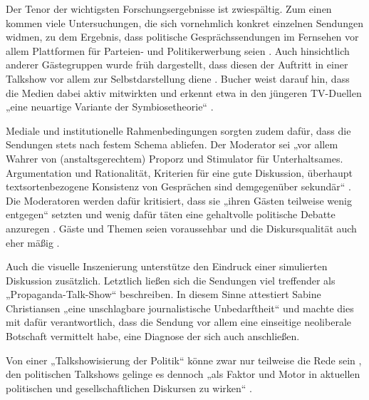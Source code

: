 Der Tenor der wichtigsten Forschungsergebnisse ist zwiespältig. Zum einen kommen viele Untersuchungen, die sich vornehmlich konkret einzelnen Sendungen widmen, zu dem Ergebnis, dass politische Gesprächssendungen im Fernsehen vor allem Plattformen für Parteien- und Politikerwerbung seien \parencites[199\psq]{hollyPolitischeFernsehdiskussionenZur1986}{schrottElefantenUnterSich1996}. Auch hinsichtlich anderer Gästegruppen wurde früh dargestellt, dass diesen der Auftritt in einer Talkshow vor allem zur Selbstdarstellung diene \parencite[162]{bayerTalkShowInszenierte1975}. Bucher weist darauf hin, dass die Medien dabei aktiv mitwirkten und erkennt etwa in den jüngeren TV-Duellen „eine neuartige Variante der Symbiosetheorie“ \parencite[302]{bucherMedienrealitaetPolitischenZur2004}.

Mediale und institutionelle Rahmenbedingungen sorgten zudem dafür, dass die Sendungen stets nach festem Schema abliefen. Der Moderator sei „vor allem Wahrer von (anstaltsgerechtem) Proporz und Stimulator für Unterhaltsames. Argumentation und Rationalität, Kriterien für eine gute Diskussion, überhaupt textsortenbezogene Konsistenz von Gesprächen sind demgegenüber sekundär“ \parencites[202]{hollyPolitischeFernsehdiskussionenZur1986}[vgl. auch][32\psq]{barloewenGrosseVorbildFernsehproduktion1975}[390\psqq]{nielandTalkshowisierungWahlkampfesAnalyse2002}. Die Moderatoren werden dafür kritisiert, dass sie „ihren Gästen teilweise wenig entgegen“ \parencite[314]{schultzModerationPolitischerGesprachsrunden2004} setzten und wenig dafür täten eine gehaltvolle politische Debatte anzuregen \parencite[151, passim]{tenscherShowdownImFernsehen1998}. Gäste und Themen seien voraussehbar \parencite[390\psqq]{nielandTalkshowisierungWahlkampfesAnalyse2002} und die Diskursqualität auch eher mäßig \parencite[226]{schichaInszenierungPolitischerDiskurse2002}.

Auch die visuelle Inszenierung unterstütze den Eindruck einer simulierten Diskussion zusätzlich. Letztlich ließen sich die Sendungen viel treffender als „Propaganda-Talk-Show“ \parencite[204]{hollyPolitischeFernsehdiskussionenZur1986} beschreiben. In diesem Sinne attestiert \textcite[13]{rossumMeineSonntageMit2004} Sabine Christiansen „eine unschlagbare journalistische Unbedarftheit“ und machte dies mit dafür verantwortlich, dass die Sendung vor allem eine einseitige neoliberale Botschaft vermittelt habe, eine Diagnose der sich auch \textcite{muellerSchaubuehneFuerEinflussreichen2006} anschließen.

Von einer „Talkshowisierung der Politik“ könne zwar nur teilweise die Rede sein \parencite[389]{nielandTalkshowisierungWahlkampfesAnalyse2002}, den politischen Talkshows gelinge es dennoch „als Faktor und Motor in aktuellen politischen und gesellschaftlichen Diskursen zu wirken“ \parencite[390]{nielandTalkshowisierungWahlkampfesAnalyse2002}.


